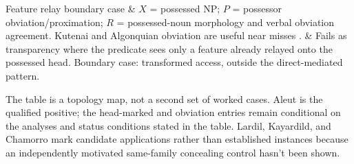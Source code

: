 {\begin{longtable}[]
\addlinespace
Feature relay boundary case & $X$ = possessed NP; $P$ = possessor obviation/proximation; $R$ = possessed-noun morphology and verbal obviation agreement. Kutenai and Algonquian obviation are useful near misses \autocite{dryer-1992-kutenai-algonquian-obviation}. & Fails as transparency where the predicate sees only a feature already relayed onto the possessed head. Boundary case: transformed access, outside the direct-mediated pattern. \\
\end{longtable}
}

The table is a topology map, not a second set of worked cases. Aleut is the qualified positive; the head-marked and obviation entries remain conditional on the analyses and status conditions stated in the table. Lardil, Kayardild, and Chamorro mark candidate applications rather than established instances because an independently motivated same-family concealing control hasn't been shown.
